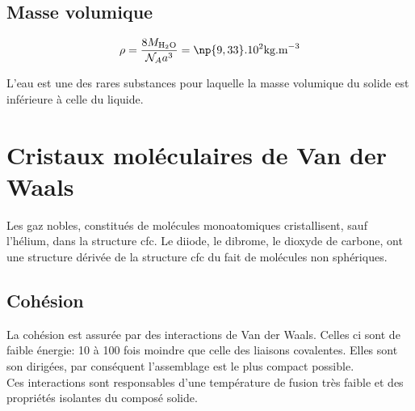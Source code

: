 \subsection{Masse volumique}
\begin{equation}
    \rho = \frac{8M_{\text{H}_2\text{O}}}{\mathcal{N}_A
        a^3} = \np{9,33}.10^2\text{kg.m}^{-3}
\end{equation}
\begin{rem}
    L'eau est une des rares substances pour laquelle la
    masse volumique du solide est inférieure à celle du
    liquide.
\end{rem}


\section{Cristaux moléculaires de Van der Waals}
Les gaz nobles, constitués de molécules monoatomiques
cristallisent, sauf l’hélium, dans la structure cfc.
Le diiode, le dibrome, le dioxyde de carbone, ont
une structure dérivée de la structure cfc du
fait de molécules non sphériques.
\subsection{Cohésion}
La cohésion est assurée par des interactions de
Van der Waals. Celles ci sont de faible énergie:
10 à 100 fois moindre que celle des liaisons covalentes.
Elles sont son dirigées, par conséquent l'assemblage
est le plus compact possible.\\
Ces interactions sont responsables d'une température de
fusion très faible et des propriétés isolantes du composé
solide.

